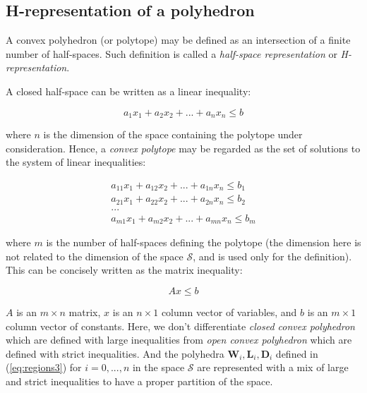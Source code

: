 \documentclass[11pt]{article}
\numberwithin{equation}{section}
\numberwithin{figure}{section}
\numberwithin{table}{section}
\begin{document}
\subsection{H-representation of a polyhedron}\label{sec:polytope}

A convex polyhedron (or polytope) may be defined as an intersection of a finite number of half-spaces. Such definition is called a \textit{half-space representation} or \textit{H-representation}.

\noindent A closed half-space can be written as a linear inequality:

\begin{equation}
a_{1}x_{1} + a_{2}x_{2} + ... + a_{n}x_{n} \leq b
\label{eq:closedHalfSpace}
\end{equation}

\noindent where $n$ is the dimension of the space containing the polytope under consideration. Hence, a \textit{convex polytope} may be regarded as the set of solutions to the system of linear inequalities:

\begin{equation}
\begin{array}{l}
a_{11}x_{1} + a_{12}x_{2} + ... + a_{1n}x_{n} \leq b_{1}\\
a_{21}x_{1} + a_{22}x_{2} + ... + a_{2n}x_{n} \leq b_{2}\\
...\\
a_{m1}x_{1} + a_{m2}x_{2} + ... + a_{mn}x_{n} \leq b_{m}
\end{array}
\label{eq:hRepresentation}
\end{equation}

\noindent where $m$ is the number of half-spaces defining the polytope (the dimension here is not related to the dimension of the space $\mathcal{S}$, and is used only for the definition). This can be concisely written as the matrix inequality:

\begin{equation}
Ax \leq b
\label{eq:matRepresentation}
\end{equation}

\noindent $A$ is an $m\times n$ matrix, $x$ is an $n\times 1$ column vector of variables, and $b$ is an $m\times 1$ column vector of constants. Here, we don't differentiate \textit{closed convex polyhedron} which are defined with large inequalities from \textit{open convex polyhedron} which are defined with strict inequalities. And the polyhedra $\textbf{W}_{i}, \textbf{L}_{i}, \textbf{D}_{i}$ defined in (\ref{eq:regions3}) for $i=0,...,n$ in the space $\mathcal{S}$ are represented with a mix of large and strict inequalities to have a proper partition of the space.
\end{document}

